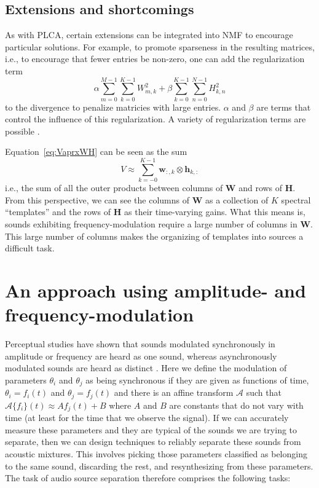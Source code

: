 \subsection{Extensions and shortcomings}

As with PLCA, certain extensions can be integrated into NMF to encourage
particular solutions. For example, to promote sparseness in the resulting
matrices, i.e., to encourage that fewer entries be non-zero, one can add the
regularization term
\[
    \alpha\sum_{m=0}^{M-1}\sum_{k=0}^{K-1} W_{m,k}^{2}
    +
    \beta\sum_{k=0}^{K-1}\sum_{n=0}^{N-1} H_{k,n}^{2}
\]
to the divergence to penalize matricies with large entries. $\alpha$ and $\beta$
are terms that control the influence of this regularization. A variety of
regularization terms are possible \cite[ch.~3]{cichocki2009nonnegative}.

Equation~\ref{eq:VaprxWH} can be seen as the sum
\[
    V
    \approx
    \sum_{k=-0}^{K-1}\boldsymbol{w}_{:,k}\otimes\boldsymbol{h}_{k,:}
\]
i.e., the sum of all the outer products between columns of $\boldsymbol{W}$ and
rows of $\boldsymbol{H}$. From this perspective, we can see the columns of
$\boldsymbol{W}$ as a collection of $K$ spectral ``templates'' and the rows of
$\boldsymbol{H}$ as their time-varying gains. What this means is, sounds
exhibiting frequency-modulation require a large number of columns in
$\boldsymbol{W}$. This large number of columns makes the organizing of
templates into sources a difficult task.

\section{An approach using amplitude- and frequency-modulation
\label{sec:amfmapproach}}

Perceptual studies have shown that sounds modulated synchronously in amplitude
or frequency are heard as one sound, whereas asynchronously modulated sounds are
heard as distinct \cite{mcadams1989segregation} \cite{marin1991segregation}.
Here we define the modulation of parameters $\theta_i$ and $\theta_j$ as being
synchronous if they are given as functions of time, $\theta_i=f_i(t)$ and
$\theta_j=f_j(t)$ and there is an affine transform $\mathscr{A}$ such that
$\mathscr{A}\{f_i\}(t) \approx A f_j(t) + B$ where $A$ and $B$ are constants
that do not vary with time (at least for the time that we observe the signal).
If we can accurately measure these parameters and they are typical of the sounds
we are trying to separate, then we can design techniques to reliably separate
these sounds from acoustic mixtures. This involves picking those parameters
classified as belonging to the same sound, discarding the rest, and
resynthesizing from these parameters. The task of audio source separation
therefore comprises the following tasks:

